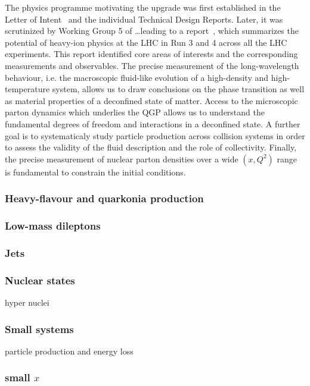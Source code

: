 The physics programme motivating the upgrade was first established in the Letter of Intent~\cite{Abelevetal:2014cna} and the individual Technical Design Reports. Later, it was scrutinized by Working Group 5 of \dots leading to a report~\cite{Citron:2018lsq}, which summarizes the potential of heavy-ion physics at the LHC in Run 3 and 4 across all the LHC experiments. This report identified core areas of interests and the corresponding measurements and observables. The precise measurement of the long-wavelength behaviour, i.e. the macroscopic fluid-like evolution of a high-density and high-temperature system, allows us to draw conclusions on the phase transition as well as material properties of a deconfined state of matter. Access to the microscopic parton dynamics which underlies the QGP allows us to understand the fundamental degrees of freedom and interactions in a deconfined state. A further goal is to systematicaly study particle production across collision systems in order to assess the validity of the fluid description and the role of collectivity. Finally, the precise measurement of nuclear parton densities over a wide $(x, Q^2)$ range is fundamental to constrain the initial conditions.

\subsubsection{Heavy-flavour and quarkonia production}

\subsubsection{Low-mass dileptons}

\subsubsection{Jets}

\subsubsection{Nuclear states}

hyper nuclei

\subsubsection{Small systems}

particle production and energy loss

\subsubsection{small $x$}

